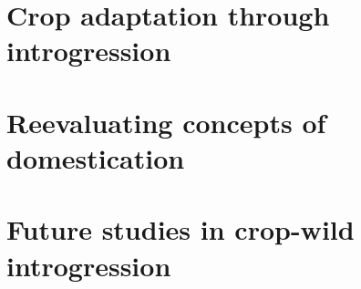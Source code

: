 \documentclass[11pt]{article}
\begin{document}
\section*{Crop adaptation through introgression}
\cite{Hufford2013} \cite{Baute2015} \cite{Bredeson2015} \cite{Poets2015} \cite{Huang2012}

\section*{Reevaluating concepts of domestication}

\section*{Future studies in crop-wild introgression}


\end{document}

